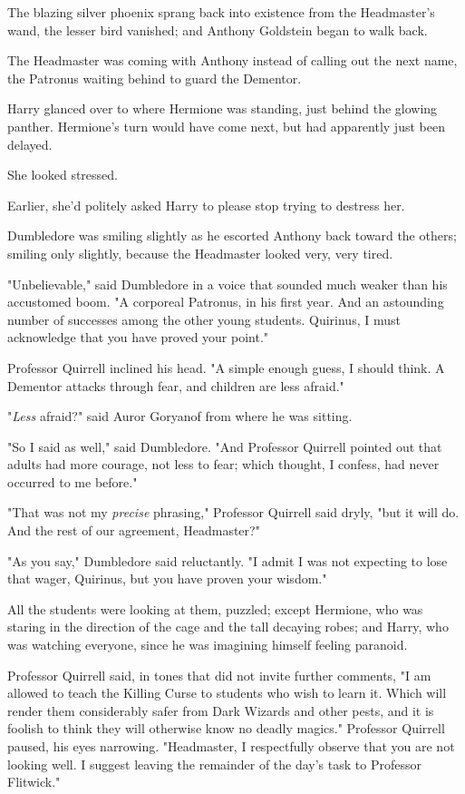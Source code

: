 The blazing silver phoenix sprang back into existence from the Headmaster's
wand, the lesser bird vanished; and Anthony Goldstein began to walk back.

The Headmaster was coming with Anthony instead of calling out the next name,
the Patronus waiting behind to guard the Dementor.

Harry glanced over to where Hermione was standing, just behind the glowing
panther. Hermione's turn would have come next, but had apparently just been
delayed.

She looked stressed.

Earlier, she'd politely asked Harry to please stop trying to destress her.

Dumbledore was smiling slightly as he escorted Anthony back toward the others;
smiling only slightly, because the Headmaster looked very, very tired.

"Unbelievable," said Dumbledore in a voice that sounded much weaker than his
accustomed boom. "A corporeal Patronus, in his first year. And an astounding
number of successes among the other young students. Quirinus, I must
acknowledge that you have proved your point."

Professor Quirrell inclined his head. "A simple enough guess, I should think. A
Dementor attacks through fear, and children are less afraid."

"\emph{Less} afraid?" said Auror Goryanof from where he was sitting.

"So I said as well," said Dumbledore. "And Professor Quirrell pointed out that
adults had more courage, not less to fear; which thought, I confess, had never
occurred to me before."

"That was not my \emph{precise} phrasing," Professor Quirrell said dryly, "but
it will do. And the rest of our agreement, Headmaster?"

"As you say," Dumbledore said reluctantly. "I admit I was not expecting to lose
that wager, Quirinus, but you have proven your wisdom."

All the students were looking at them, puzzled; except Hermione, who was
staring in the direction of the cage and the tall decaying robes; and Harry,
who was watching everyone, since he was imagining himself feeling paranoid.

Professor Quirrell said, in tones that did not invite further comments, "I am
allowed to teach the Killing Curse to students who wish to learn it. Which will
render them considerably safer from Dark Wizards and other pests, and it is
foolish to think they will otherwise know no deadly magics." Professor Quirrell
paused, his eyes narrowing. "Headmaster, I respectfully observe that you are
not looking well. I suggest leaving the remainder of the day's task to
Professor Flitwick."

